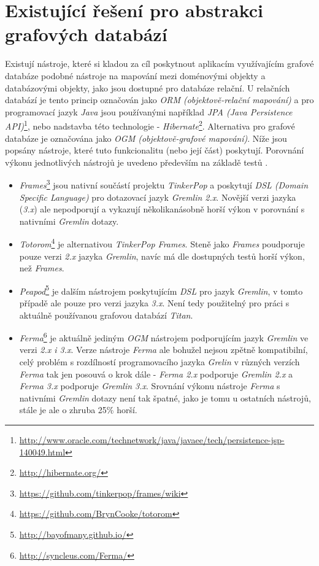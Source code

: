 \section{Existující řešení pro abstrakci grafových databází}
\label{sec:ana_state_of_art}
Existují nástroje, které si kladou za cíl poskytnout aplikacím využívajícím grafové databáze podobné nástroje na mapování mezi doménovými objekty a databázovými objekty, jako jsou dostupné pro databáze relační. U relačních databází je tento princip označován jako \textit{ORM (objektově-relační mapování)} a pro programovací jazyk \textit{Java} jsou používanými například \textit{JPA (Java Persistence API)}\footnote{\url{http://www.oracle.com/technetwork/java/javaee/tech/persistence-jsp-140049.html}}, nebo nadstavba této technologie - \textit{Hibernate}\footnote{\url{http://hibernate.org/}}. Alternativa pro grafové databáze je označována jako \textit{OGM (objektově-grafové mapování)}. Níže jsou popsány nástroje, které tuto funkcionalitu (nebo její část) poskytují. Porovnání výkonu jednotlivých nástrojů je uvedeno především na základě testů \cite{FermaBenchmarks}.

\begin{itemize}
	\item{\textit{Frames}}\footnote{\url{https://github.com/tinkerpop/frames/wiki}} jsou nativní součástí projektu \textit{TinkerPop} a poskytují \textit{DSL (Domain Specific Language)} pro dotazovací jazyk \textit{Gremlin 2.x}. Novější verzi jazyka (\textit{3.x}) ale nepodporují a vykazují několikanásobně horší výkon v porovnání s nativními \textit{Gremlin} dotazy.

	\item{\textit{Totorom}}\footnote{\url{https://github.com/BrynCooke/totorom}} je alternativou \textit{TinkerPop Frames}. Steně jako \textit{Frames} poudporuje pouze verzi \textit{2.x} jazyka \textit{Gremlin}, navíc má dle dostupných testů horší výkon, než \textit{Frames}.

	\item{\textit{Peapod}}\footnote{\url{http://bayofmany.github.io/}} je dalším nástrojem poskytujícím \textit{DSL} pro jazyk \textit{Gremlin}, v tomto případě ale pouze pro verzi jazyka \textit{3.x}. Není tedy použitelný pro práci s aktuálně používanou grafovou databází \textit{Titan}.

	\item{\textit{Ferma}}\footnote{\url{http://syncleus.com/Ferma/}} je aktuálně jediným \textit{OGM} nástrojem podporujícím jazyk \textit{Gremlin} ve verzi \textit{2.x i 3.x}. Verze nástroje \textit{Ferma} ale bohužel nejsou zpětně kompatibilní, celý problém s rozdílností programovacího jazyka \textit{Grelin} v různých verzích \textit{Ferma} tak jen posouvá o krok dále - \textit{Ferma 2.x} podporuje \textit{Gremlin 2.x} a \textit{Ferma 3.x} podporuje \textit{Gremlin 3.x}. Srovnání výkonu nástroje \textit{Ferma} s nativními \textit{Gremlin} dotazy není tak špatné, jako je tomu u ostatních nástrojů, stále je ale o zhruba 25\% horší.
\end{itemize}

